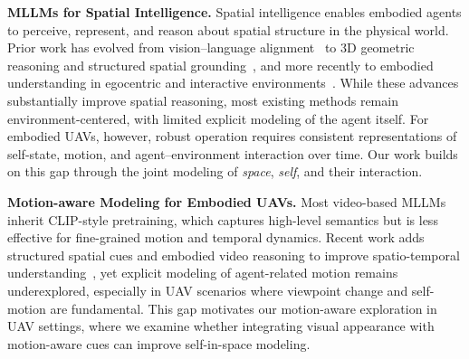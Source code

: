 \documentclass[sigconf, screen, review, anonymous]{acmart}
\newcommand{\pjc}[1]{\textcolor{red}{#1}}
\begin{document}
\noindent\textbf{MLLMs for Spatial Intelligence.}
Spatial intelligence enables embodied agents to perceive, represent, and reason about spatial structure in the physical world. Prior work has evolved from vision--language alignment~\cite{radford2021learning,li2023blip} to 3D geometric reasoning and structured spatial grounding~\cite{chen2024ll3da,hong20233d,chen2024spatialvlm,chen2024grounded,wang2023chat,huang2023embodied,huang2024chat,fu2024scene,zhu2024llava,zheng2025video,qi2025gpt4scene}, and more recently to embodied understanding in egocentric and interactive environments~\cite{EgoSchema,majumdar2024openeqa,fu2025objectrelator,pan2026v,mahdi2025exo2egosyn}. While these advances substantially improve spatial reasoning, most existing methods remain environment-centered, with limited explicit modeling of the agent itself. For embodied UAVs, however, robust operation requires consistent representations of self-state, motion, and agent--environment interaction over time. Our work builds on this gap through the joint modeling of \emph{space}, \emph{self}, and their interaction.

\noindent\textbf{Motion-aware Modeling for Embodied UAVs.} Most video-based MLLMs inherit CLIP-style pretraining, which captures high-level semantics but is less effective for fine-grained motion and temporal dynamics. Recent work adds structured spatial cues and embodied video reasoning to improve spatio-temporal understanding~\cite{chen2024spatialvlm,zheng2025video,majumdar2024openeqa}, yet explicit modeling of agent-related motion remains underexplored, especially in UAV scenarios where viewpoint change and self-motion are fundamental. This gap motivates our motion-aware exploration in UAV settings, where we examine whether integrating visual appearance with motion-aware cues can improve self-in-space modeling.




\end{document}
